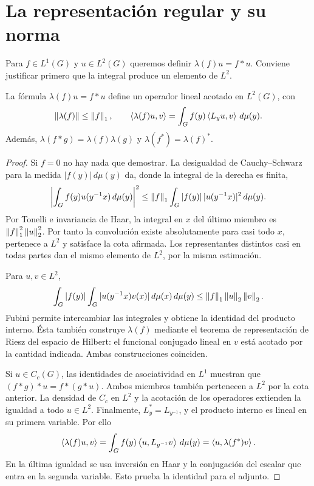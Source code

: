 \section{La representación regular y su norma}\label{lectura:v4-27}
Para $f\in L^1(G)$ y $u\in L^2(G)$ queremos definir $\lambda(f)u=f*u$. Conviene justificar primero que la integral produce un elemento de $L^2$.

\begin{proposicion}\label{v4:regular-l2}
La fórmula $\lambda(f)u=f*u$ define un operador lineal acotado en $L^2(G)$, con
\[
 \left\lVert\lambda(f)\right\rVert\le\left\lVert f\right\rVert_1,
 \qquad
 \left\langle\lambda(f)u,v\right\rangle
 =\int_G f(y)\left\langle L_yu,v\right\rangle\,d\mu(y).
\]
Además, $\lambda(f*g)=\lambda(f)\lambda(g)$ y $\lambda(f^*)=\lambda(f)^*$.
\end{proposicion}
\begin{proof}
Si $f=0$ no hay nada que demostrar. La desigualdad de Cauchy--Schwarz para la medida $|f(y)|\,d\mu(y)$ da, donde la integral de la derecha es finita,
\[
 \left|\int_G f(y)u(y^{-1}x)\,d\mu(y)\right|^2
 \le\left\lVert f\right\rVert_1\int_G|f(y)|\,|u(y^{-1}x)|^2\,d\mu(y).
\]
Por Tonelli e invariancia de Haar, la integral en $x$ del último miembro es $\left\lVert f\right\rVert_1^2\left\lVert u\right\rVert_2^2$. Por tanto la convolución existe absolutamente para casi todo $x$, pertenece a $L^2$ y satisface la cota afirmada. Los representantes distintos casi en todas partes dan el mismo elemento de $L^2$, por la misma estimación.

Para $u,v\in L^2$,
\[
 \int_G|f(y)|\int_G|u(y^{-1}x)v(x)|\,d\mu(x)\,d\mu(y)
 \le\left\lVert f\right\rVert_1\left\lVert u\right\rVert_2\left\lVert v\right\rVert_2.
\]
Fubini permite intercambiar las integrales y obtiene la identidad del producto interno. Ésta también construye $\lambda(f)$ mediante el teorema de representación de Riesz del espacio de Hilbert: el funcional conjugado lineal en $v$ está acotado por la cantidad indicada. Ambas construcciones coinciden.

Si $u\in C_c(G)$, las identidades de asociatividad en $L^1$ muestran que
$(f*g)*u=f*(g*u)$. Ambos miembros también pertenecen a $L^2$ por la cota anterior. La densidad de $C_c$ en $L^2$ y la acotación de los operadores extienden la igualdad a todo $u\in L^2$.
Finalmente, $L_y^*=L_{y^{-1}}$, y el producto interno es lineal en su primera variable. Por ello
\[
 \left\langle\lambda(f)u,v\right\rangle
 =\int_G f(y)\left\langle u,L_{y^{-1}}v\right\rangle\,d\mu(y)
 =\left\langle u,\lambda(f^*)v\right\rangle.
\]
En la última igualdad se usa inversión en Haar y la conjugación del escalar que entra en la segunda variable. Esto prueba la identidad para el adjunto.
\end{proof}


